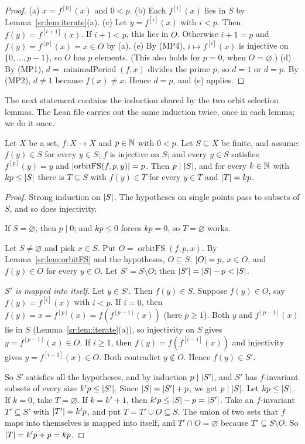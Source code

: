 \begin{proof}
(a) $x=f^{[0]}(x)$ and $0<p$. (b) Each $f^{[i]}(x)$ lies in $S$ by Lemma~\ref{sr:lem:iterate}(a). (c) Let
$y=f^{[i]}(x)$ with $i<p$. Then $f(y)=f^{[i+1]}(x)$. If $i+1<p$, this lies in $O$. Otherwise $i+1=p$ and
$f(y)=f^{[p]}(x)=x\in O$ by (a). (e) By (MP4), $i\mapsto f^{[i]}(x)$ is injective on $\{0,\dots,p-1\}$, so $O$ has $p$
elements. (This also holds for $p=0$, when $O=\varnothing$.) (d) By (MP1), $d=\operatorname{minimalPeriod}(f,x)$ divides
the prime $p$, so $d=1$ or $d=p$. By (MP2), $d\ne1$ because $f(x)\ne x$. Hence $d=p$, and (e) applies.
\end{proof}

The next statement contains the induction shared by the two orbit selection lemmas. The Lean file carries out the same
induction twice, once in each lemma; we do it once.

\begin{lemma}\label{sr:lem:orbit-core}
Let $X$ be a set, $f\colon X\to X$ and $p\in\mathbb N$ with $0<p$. Let $S\subseteq X$ be finite, and assume: $f(y)\in S$ for
every $y\in S$; $f$ is injective on $S$; and every $y\in S$ satisfies $f^{[p]}(y)=y$ and
$\lvert\operatorname{orbitFS}(f,p,y)\rvert=p$. Then $p\mid\lvert S\rvert$, and for every $k\in\mathbb N$ with $kp\le\lvert S\rvert$ there is
$T\subseteq S$ with $f(y)\in T$ for every $y\in T$ and $\lvert T\rvert=kp$.
\end{lemma}

\begin{proof}
Strong induction on $\lvert S\rvert$. The hypotheses on single points pass to subsets of $S$, and so does injectivity.

If $S=\varnothing$, then $p\mid0$; and $kp\le0$ forces $kp=0$, so $T=\varnothing$ works.

Let $S\ne\varnothing$ and pick $x\in S$. Put $O=\operatorname{orbitFS}(f,p,x)$. By Lemma~\ref{sr:lem:orbitFS} and the
hypotheses, $O\subseteq S$, $\lvert O\rvert=p$, $x\in O$, and $f(y)\in O$ for every $y\in O$. Let $S'=S\setminus O$; then
$\lvert S'\rvert=\lvert S\rvert-p<\lvert S\rvert$.

\emph{$S'$ is mapped into itself.} Let $y\in S'$. Then $f(y)\in S$. Suppose $f(y)\in O$, say $f(y)=f^{[i]}(x)$ with
$i<p$. If $i=0$, then $f(y)=x=f^{[p]}(x)=f(f^{[p-1]}(x))$ (here $p\ge1$). Both $y$ and $f^{[p-1]}(x)$ lie in $S$
(Lemma~\ref{sr:lem:iterate}(a)), so injectivity on $S$ gives $y=f^{[p-1]}(x)\in O$. If $i\ge1$, then
$f(y)=f(f^{[i-1]}(x))$ and injectivity gives $y=f^{[i-1]}(x)\in O$. Both contradict $y\notin O$. Hence $f(y)\in S'$.

So $S'$ satisfies all the hypotheses, and by induction $p\mid\lvert S'\rvert$, and $S'$ has $f$-invariant subsets of every
size $k'p\le\lvert S'\rvert$. Since $\lvert S\rvert=\lvert S'\rvert+p$, we get $p\mid\lvert S\rvert$. Let $kp\le\lvert S\rvert$. If $k=0$, take
$T=\varnothing$. If $k=k'+1$, then $k'p\le\lvert S\rvert-p=\lvert S'\rvert$. Take an $f$-invariant $T'\subseteq S'$ with
$\lvert T'\rvert=k'p$, and put $T=T'\cup O\subseteq S$. The union of two sets that $f$ maps into themselves is mapped into
itself, and $T'\cap O=\varnothing$ because $T'\subseteq S\setminus O$. So $\lvert T\rvert=k'p+p=kp$.
\end{proof}


